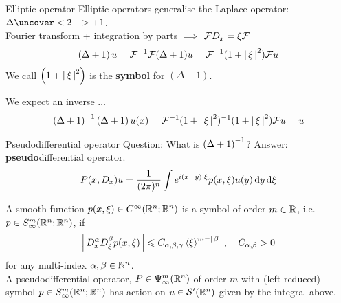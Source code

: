 \documentclass{beamer}
\begin{document}
\begin{frame}{Elliptic operator}
Elliptic operators generalise the Laplace operator: $\Delta \uncover<2->{+1}$. \\
Fourier transform + integration by parts $\implies$ $\F D_x = \xi \F $ 
\begin{align*}
\brac{\Delta + 1} u = \F^{-1} \F (\Delta + 1) u = \F^{-1} (1 + \abs{\xi}^2) \F u 
\end{align*}
We call $\brac{1 + \abs{\xi}^2} $ is the \textbf{symbol} for $(\Delta + 1)$.  

We expect an inverse $\dots$ 
\begin{align*}
\brac{\Delta + 1}^{-1} \brac{\Delta + 1} u(x) = \F^{-1} (1 + \abs{\xi}^2)^{-1} (1 + \abs{\xi}^2) \F u = u 
\end{align*}

\end{frame} 

\begin{frame}{Pseudodifferential operator}
Question: What is $\brac{\Delta + 1}^{-1}$? Answer: \textbf{pseudo}differential operator. 
\begin{align*}
P(x, D_x) u = \frac{1}{(2\pi)^n} \int e^{i(x - y) \cdot \xi} p(x, \xi) u(y) \d[y] \d[\xi]  \label{eq: action of symbol} 
\end{align*}
\begin{definition} A smooth function $p(x, \xi) \in C^\infty(\R^{n}; \R^n)$ is a symbol of order $m \in \R$, i.e. $p \in S^{m}_\infty(\R^{n}; \R^n)$, if
    \begin{align*}
    \abs{D^{\alpha}_x D^\beta_\xi p(x, \xi)} \leq C_{\alpha, \beta, \gamma}  \sym[\xi]^{m - \abs{\beta}}, \quad C_{\alpha, \beta}  > 0
    \end{align*}
    for any multi-index $\alpha, \beta \in \N^n$. \\
    
    A pseudodifferential operator, $P \in \Psi^{m}_{\infty}(\R^n)$ of order $m$ with (left reduced) symbol $p \in S^{m}_\infty(\R^{n}; \R^n)$ has action on $u \in \sch'(\R^n)$ given by the integral above. 
\end{definition}
\end{frame} 
\end{document}
